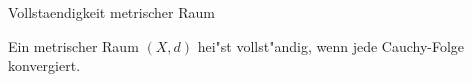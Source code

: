 \documentclass[class=article, crop=false]{standalone}
\begin{document}
\begin{zettel}{Vollstaendigkeit metrischer Raum}
\begin{flashcard}[]{}
	\begin{definition}
		Ein metrischer Raum $(X,d)$ hei"st vollst"andig, wenn jede Cauchy-Folge konvergiert.
	\end{definition}

\end{flashcard}
\end{zettel}
\end{document}

